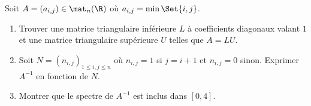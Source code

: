 \begin{enonce}
\begin{exercise}[ID={RMS123 E580, Mines PSI},subtitle={},tags={}]
Soit $A=\left( a_{i,j} \right)\in\mat_n(\R)$ où $a_{i,j}=\min\Set{i,j}$.
\begin{enumerate}
  \item Trouver une matrice triangulaire inférieure $L$ à coefficients diagonaux valant $1$ et une matrice triangulaire supérieure $U$ telles que $A=LU$.
  \item Soit $N=\left( n_{i,j} \right)_{1\leq i,j\leq n}$ où $n_{i,j}=1$ si $j=i+1$ et $n_{i,j}=0$ sinon.
    Exprimer $A^{-1}$ en fonction de $N$.
  \item Montrer que le spectre de $A^{-1}$ est inclus dans $\left[0,4\right]$.
\end{enumerate}
\end{exercise}
\begin{solution}
\end{solution}
\end{enonce}
